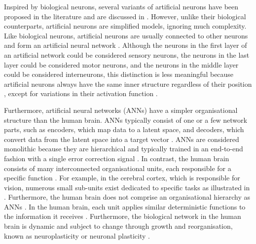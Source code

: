Inspired by biological neurons, several variants of artificial neurons  have been proposed in the literature and are discussed in .
However, unlike their biological counterparts, artificial neurons are simplified models, ignoring much complexity. Like biological neurons, artificial neurons are usually connected to other neurons and form an artificial neural network . Although the neurons in the first layer of an artificial network could be considered sensory neurons, the neurons in the last layer could be considered motor neurons, and the neurons in the middle layer could be considered interneurons, this distinction is less meaningful because artificial neurons always have the same inner structure regardless of their position , except for variations in their activation function \cite{fukushima_visual_1969}.

Furthermore, artificial neural networks (ANNs) have a simpler organisational structure than the human brain. ANNs typically consist of one or a few network parts, such as encoders, which map data to a latent space, and decoders, which convert data from the latent space into a target vector . ANNs are considered monolithic because they are hierarchical and typically trained in an end-to-end fashion with a single error correction signal . In contrast, the human brain consists of many interconnected organisational units, each responsible for a specific function . For example, in the cerebral cortex, which is responsible for vision, numerous small sub-units exist dedicated to specific tasks as illustrated in .
Furthermore, the human brain does not comprise an organisational hierarchy as ANNs . In the human brain, each unit applies similar deterministic functions to the information it receives \cite{mountcastle_organizing_1978, mountcastle_columnar_1997}. Furthermore, the biological network in the human brain is dynamic and subject to change through growth and reorganisation, known as neuroplasticity or neuronal plasticity .

